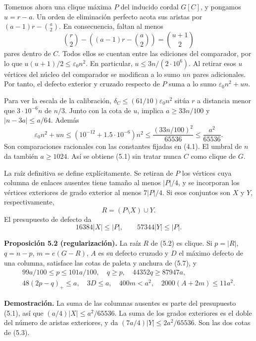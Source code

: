 \documentclass[spanish,11pt,a4paper]{article}
\begin{document}
Tomemos ahora una clique máxima \(P\) del inducido cordal \(G[C]\), y pongamos \(u=r-a\). Un orden de eliminación perfecto acota sus aristas por \((a-1)r-\binom a2\). En consecuencia, faltan al menos \[
\binom r2-\left((a-1)r-\binom a2\right)
=\binom{u+1}{2}
\] pares dentro de \(C\). Todos ellos se cuentan entre las ediciones del comparador, por lo que \(u(u+1)/2\le\varepsilon_0n^2\). En particular, \(u\le3n/(2\cdot10^6)\). Al retirar esos \(u\) vértices del núcleo del comparador se modifican a lo sumo \(un\) pares adicionales. Por tanto, el defecto exterior y cruzado respecto de \(P\) suma a lo sumo \(\varepsilon_0n^2+un\).

Para ver la escala de la calibración, \(\delta_C\le(61/10)\varepsilon_0n^2\) sitúa \(r\) a distancia menor que \(3\cdot10^{-6}n\) de \(n/3\). Junto con la cota de \(u\), implica \(a\ge33n/100\) y \(|n-3a|\le a/64\). Además \[
\varepsilon_0n^2+un\le(10^{-12}+1.5\cdot10^{-6})n^2
\le\frac{(33n/100)^2}{65536}\le\frac{a^2}{65536}.
\] Son comparaciones racionales con las constantes fijadas en (4.1). El umbral de \(n\) da también \(a\ge1024\). Así se obtiene (5.1) sin tratar nunca \(C\) como clique de \(G\).

La raíz definitiva se define explícitamente. Se retiran de \(P\) los vértices cuya columna de enlaces ausentes tiene tamaño al menos \(|P|/4\), y se incorporan los vértices exteriores de grado exterior al menos \(7|P|/4\). Si esos conjuntos son \(X\) y \(Y\), respectivamente, \[
R=(P\setminus X)\cup Y.
\tag{5.2}
\] El presupuesto de defecto da \[
16384|X|\le |P|,\qquad 57344|Y|\le |P|.
\tag{5.3}
\] 

\textbf{Proposición 5.2 (regularización).} La raíz \(R\) de (5.2) es clique. Si \(p=|R|\), \(q=n-p\), \(m=e(G-R)\), \(A\) es su defecto cruzado y \(D\) el máximo defecto de una columna, satisface las cotas de paleta y anchura de (5.7), y \[
\begin{gathered}
99a/100\le p\le101a/100,\quad q\ge p,\quad
44352q\ge87947a,\\
48(2p-q)_+\le a,\quad 3D\le a,\quad
400m<a^2,\quad2000(A+2m)\le11a^2.
\end{gathered}
\tag{5.4}
\]

\textbf{Demostración.} La suma de las columnas ausentes es parte del presupuesto (5.1), así que \((a/4)|X|\le a^2/65536\). La suma de los grados exteriores es el doble del número de aristas exteriores, y da \((7a/4)|Y|\le2a^2/65536\). Son las dos cotas de (5.3).
\end{document}
